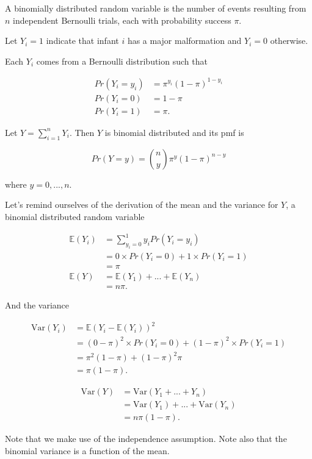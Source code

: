 \documentclass[
  letterpaper,
  DIV=11,
  numbers=noendperiod]{scrreport}
\begin{document}
A binomially distributed random variable is the number of events
resulting from \(n\) independent Bernoulli trials, each with probability
success \(\pi\).

Let \(Y_i=1\) indicate that infant \(i\) has a major malformation and
\(Y_i = 0\) otherwise.

Each \(Y_i\) comes from a Bernoulli distribution such that

\[
\begin{aligned}
Pr(Y_i = y_i) & = \pi^{y_i} (1-\pi)^{1-y_i} \\ 
Pr(Y_i = 0) & = 1- \pi \\ 
Pr(Y_i = 1) & = \pi.
\end{aligned}
\]

Let \(Y = \sum_{i=1}^n Y_i\). Then \(Y\) is binomial distributed and its
pmf is

\[
Pr(Y = y) = { n \choose y } \pi^y (1-\pi)^{n-y}
\]

where \(y = 0, ..., n.\)

Let's remind ourselves of the derivation of the mean and the variance
for \(Y\), a binomial distributed random variable

\[
\begin{aligned}
\mathbb E(Y_i) & = \sum_{y_i=0}^1 y_i Pr(Y_i = y_i) \\ 
& = 0 \times Pr(Y_i = 0) + 1 \times Pr(Y_i = 1) \\ 
& = \pi \\ 
\mathbb E(Y) & = \mathbb E(Y_1) + ... + \mathbb E(Y_n) \\ 
& = n \pi.
\end{aligned}
\]

And the variance

\[
\begin{aligned}
\text{Var}(Y_i) & = \mathbb E(Y_i - \mathbb E(Y_i))^2 \\ 
& = (0-\pi)^2 \times Pr(Y_i = 0) + (1-\pi)^2 \times Pr(Y_i = 1) \\ 
& = \pi^2 (1-\pi) + (1-\pi)^2 \pi \\ 
& = \pi(1-\pi).
\end{aligned}
\]

\[
\begin{aligned}
\text{Var}(Y) & = \text{Var}(Y_1 + ... + Y_n) \\ 
& = \text{Var}(Y_1) + ... + \text{Var}(Y_n) \\ 
& = n \pi (1 - \pi).
\end{aligned}
\]

Note that we make use of the independence assumption. Note also that the
binomial variance is a function of the mean.
\end{document}
